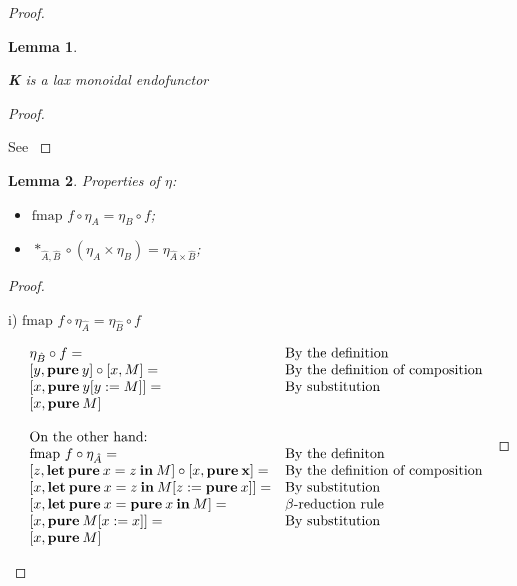 \documentclass[a4paper]{article}
\newtheorem{lemma}{Lemma}
\begin{document}
\begin{proof}
\begin{lemma}
  $ $

  {\bf K} is a lax monoidal endofunctor
\end{lemma}

\begin{proof}
$ $

See \cite{ModalK}
\end{proof}

\begin{lemma} Properties of $\eta$:

\begin{itemize}
  \item $\text{fmap } f \circ \eta_A = \eta_B \circ f$;
  \item $\ast_{\hat{A},\hat{B}} \circ (\eta_{A} \times \eta_{B}) = \eta_{\hat{A} \times \hat{B}}$;
\end{itemize}
\end{lemma}

\begin{proof}
  $ $

  i) $\text{fmap } f \circ \eta_{\hat{A}} = \eta_{\hat{B}} \circ f$

\vspace{\baselineskip}

$\begin{array}{lll}
&\eta_{\hat{B}} \circ f = & \text{By the definition} \\
&[y, {\bf pure \:} y] \circ [x, M] = & \text{By the definition of composition}\\
&[x, {\bf pure \:} y [y := M]] = & \text{By substitution}\\
&[x, {\bf pure \:} M]& \\
& &\\
&\text{On the other hand:}& \\
&\text{fmap } f \circ \eta_{\hat{A}} = & \text{By the definiton} \\
&[z, {\bf let \: pure \:} x = z {\: \bf in \:} M] \circ [x, {\bf pure \: x}] = & \text{By the definition of composition}\\
&[x, {\bf let \: pure \:} x = z {\: \bf in \:} M [z := {\bf pure \:} x]] = & \text{By substitution} \\
&[x, {\bf let \: pure \:} x = {\bf pure \:} x {\: \bf in \:} M] = & \text{$\beta$-reduction rule}\\
&[x, {\bf pure \:} M [x := x]] = & \text{By substitution}\\
&[x, {\bf pure \:} M]&
\end{array}$


\end{proof}
\end{proof}
\end{document}
